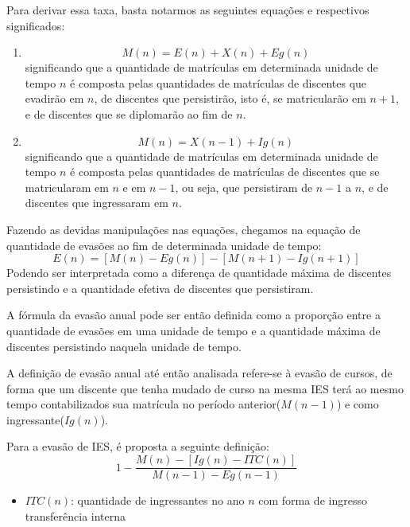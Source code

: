 \documentclass{report}
\begin{document}
Para derivar essa taxa, basta notarmos as seguintes equações e respectivos significados:
\begin{enumerate}
\item 
\begin{equation}
M(n) = E(n) + X(n) + Eg(n)
\end{equation}
significando que a quantidade de matrículas em determinada unidade de tempo $n$ é composta pelas quantidades de matrículas de discentes que evadirão em $n$, de discentes que persistirão, isto é, se matricularão em $n+1$, e de discentes que se diplomarão ao fim de $n$.
\item 
\begin{equation}
M(n) = X(n-1) + Ig(n)
\end{equation}
significando que a quantidade de matrículas em determinada unidade de tempo $n$ é composta pelas quantidades de matrículas de discentes que se matricularam em $n$ e em $n-1$, ou seja, que persistiram de $n-1$ a $n$, e de discentes que ingressaram em $n$.
\end{enumerate}

Fazendo as devidas manipulações nas equações, chegamos na equação de quantidade de evasões ao fim de determinada unidade de tempo:
\begin{equation}
E(n) = [M(n) - Eg(n)] - [M(n+1) - Ig(n+1)]
\end{equation}
Podendo ser interpretada como a diferença de quantidade máxima de discentes persistindo e a quantidade efetiva de discentes que persistiram.

A fórmula da evasão anual pode ser então definida como a proporção entre a quantidade de evasões em uma unidade de tempo e a quantidade máxima de discentes persistindo naquela unidade de tempo.

A definição de evasão anual até então analisada refere-se à evasão de cursos, de forma que um discente que tenha mudado de curso na mesma IES terá ao mesmo tempo contabilizados sua matrícula no período anterior($M(n-1)$) e como ingressante($Ig(n)$).

Para a evasão de IES, é proposta a seguinte definição:
\begin{equation}
1 - \frac{M(n) - [Ig(n) - ITC(n)]}{M(n-1) - Eg(n-1)}
\end{equation}
\begin{itemize}
\item $ITC(n)$: quantidade de ingressantes no ano $n$ com forma de ingresso transferência interna
\end{itemize}
\end{document}
